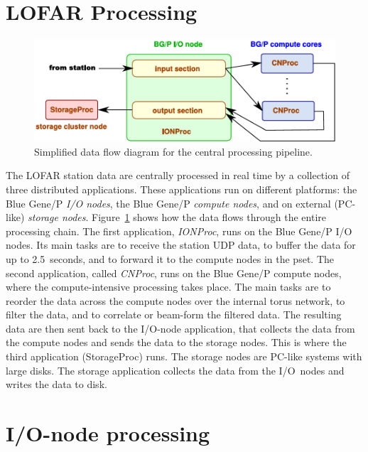 \documentclass{sig-alternate}
\begin{document}
\section{LOFAR Processing}
\label{sec:processing}

\begin{figure}[ht]
\includegraphics[width=\columnwidth]{processing-overview.pdf}
\caption{Simplified data flow diagram for the central processing pipeline.}
\label{fig:processing}
\end{figure}

The LOFAR station data are centrally processed in real time by a collection
of three distributed applications.
These applications run on different platforms:
the Blue Gene/P \emph{I/O nodes}, the Blue Gene/P \emph{compute nodes}, and on
external (PC-like) \emph{storage nodes}.
Figure~\ref{fig:processing} shows how the data flows through the entire
processing chain.
The first application, \emph{IONProc}, runs on the Blue Gene/P I/O nodes.
Its main tasks are to receive the station UDP data, to buffer the data
for up to 2.5~seconds, and to forward it to the compute nodes in the pset.
The second application, called \emph{CNProc}, runs on the Blue Gene/P compute
nodes, where the compute-intensive processing takes place.
The main tasks are to reorder the data across the compute nodes over the
internal torus network, to filter the data, and to correlate or beam-form
the filtered data.
The resulting data are then sent back to the I/O-node application, that
collects the data from the compute nodes and
sends the data to the storage nodes.
This is where the third application (StorageProc) runs.
The storage nodes are PC-like systems with large disks.
The storage application collects the data from the I/O~nodes and writes the
data to disk.


\section{I/O-node processing}
\label{sec:IONProc}
\end{document}
